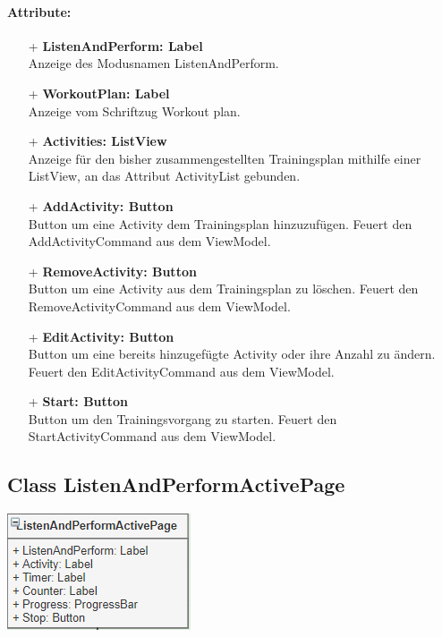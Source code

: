 \documentclass[a4paper,12pt]{article}
\begin{document}
\paragraph{Attribute:}
	\begin{itemize}
	\item[+] \textbf{ListenAndPerform: Label} \\ Anzeige des Modusnamen ListenAndPerform.
	\item[+] \textbf{WorkoutPlan: Label} \\ Anzeige vom Schriftzug Workout plan.
	\item[+] \textbf{Activities: ListView} \\	Anzeige für den bisher zusammengestellten Trainingsplan mithilfe einer ListView, an das Attribut ActivityList gebunden. 
	\item[+] \textbf{AddActivity: Button} \\ Button um eine Activity dem Trainingsplan hinzuzufügen. Feuert den AddActivityCommand aus dem ViewModel.
	\item[+] \textbf{RemoveActivity: Button} \\ Button um eine Activity aus dem Trainingsplan zu löschen. Feuert den RemoveActivityCommand aus dem ViewModel.
	\item[+] \textbf{EditActivity: Button} \\ Button um eine bereits hinzugefügte Activity oder ihre Anzahl zu ändern. Feuert den EditActivityCommand aus dem ViewModel.
	\item[+] \textbf{Start: Button} \\ Button um den Trainingsvorgang zu starten. Feuert den StartActivityCommand aus dem ViewModel.
	\end{itemize}

\begin{minipage}[b]{0.7\textwidth}
	\subsection{Class ListenAndPerformActivePage}
\end{minipage}
\begin{minipage}[c]{0.3\textwidth}
	\includegraphics[width=\textwidth]{bilder/ViewKlassen/ListenAndPerformActivePage.png}
\end{minipage}
\end{document}

